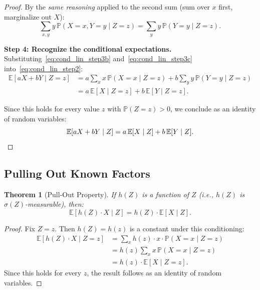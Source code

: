\documentclass[11pt,a4paper]{article}
\theoremstyle{definition}
\theoremstyle{plain}
\newtheorem{theorem}{Theorem}[section]
\theoremstyle{remark}
\newcommand{\E}{\mathbb{E}}
\newcommand{\Prob}{\mathbb{P}}
\begin{document}
\begin{proof}
By the \emph{same reasoning} applied to the second sum (sum over $x$ first, marginalize out $X$):
\begin{equation}
    \sum_{x,y} y\, \Prob(X = x, Y = y \mid Z = z) = \sum_y y\, \Prob(Y = y \mid Z = z).
    \label{eq:cond_lin_step3c}
\end{equation}

\textbf{Step 4: Recognize the conditional expectations.}
Substituting~\eqref{eq:cond_lin_step3b} and~\eqref{eq:cond_lin_step3c} into~\eqref{eq:cond_lin_step2}:
\begin{align}
    \E[aX + bY \mid Z = z]
    &= a \sum_x x\, \Prob(X = x \mid Z = z) + b \sum_y y\, \Prob(Y = y \mid Z = z) \nonumber\\
    &= a\,\E[X \mid Z = z] + b\,\E[Y \mid Z = z].
    \label{eq:cond_lin_step4}
\end{align}

Since this holds for every value $z$ with $\Prob(Z = z) > 0$, we conclude as an identity of random variables:
\begin{equation}
    \E[aX + bY \mid Z] = a\,\E[X \mid Z] + b\,\E[Y \mid Z]. \qedhere
\end{equation}
\end{proof}

\subsection{Pulling Out Known Factors}
\label{subsec:pull_out}

\begin{keyresult}
\begin{theorem}[Pull-Out Property]
\label{thm:pull_out}
If $h(Z)$ is a function of $Z$ (i.e., $h(Z)$ is $\sigma(Z)$-measurable), then:
\begin{equation}
    \E[h(Z) \cdot X \mid Z] = h(Z) \cdot \E[X \mid Z].
    \label{eq:pull_out}
\end{equation}
\end{theorem}
\end{keyresult}

\begin{proof}
Fix $Z = z$. Then $h(Z) = h(z)$ is a constant under this conditioning:
\begin{align}
    \E[h(Z) \cdot X \mid Z = z]
    &= \sum_x h(z) \cdot x \cdot \Prob(X = x \mid Z = z) \nonumber\\
    &= h(z) \sum_x x\, \Prob(X = x \mid Z = z) \nonumber\\
    &= h(z) \cdot \E[X \mid Z = z]. \label{eq:pull_out_proof}
\end{align}
Since this holds for every $z$, the result follows as an identity of random variables.
\end{proof}
\end{document}
